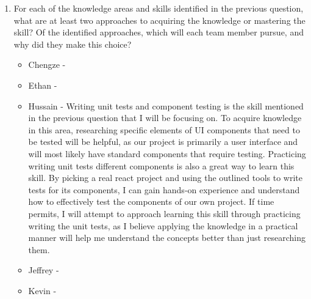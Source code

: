 \documentclass[12pt, titlepage]{article}
\begin{document}
\begin{enumerate}
  \item For each of the knowledge areas and skills identified in the previous
  question, what are at least two approaches to acquiring the knowledge or
  mastering the skill?  Of the identified approaches, which will each team
  member pursue, and why did they make this choice?
  \begin{itemize}
    \item Chengze -
    \item Ethan -
    \item Hussain - Writing unit tests and component testing is the skill 
    mentioned in the previous question that I will be focusing on. To acquire
    knowledge in this area, researching specific elements of UI components that
    need to be tested will be helpful, as our project is primarily a user 
    interface and will most likely have standard components that require testing.
    Practicing writing unit tests different components is also a great way to
    learn this skill. By picking a real react project and using the outlined 
    tools to write tests for its components, I can gain hands-on experience
    and understand how to effectively test the components of our own project. 
    If time permits, I will attempt to approach learning this skill through
    practicing writing the unit tests, as I believe applying the knowledge in a
    practical manner will help me understand the concepts better than just 
    researching them.
    \item Jeffrey -
    \item Kevin -
  \end{itemize}
\end{enumerate}
\end{document}
